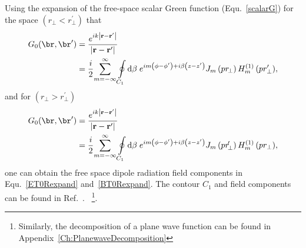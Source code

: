 \documentclass[]{report}
\begin{document}
Using the expansion of the free-space scalar Green function (Equ.~\eqref{scalarG}) for the space $ \left(r\!_\perp <r_\perp ^{\prime}\right) $ that 
\begin{align}
G_0(\br,\br') &={\frac{{e^{ik{\left| {{\rm {\bf r}}-{\rm {\bf {r}^{\prime }}}}\right| }}}}{{{%
\left| {{\rm {\bf r}}-{\rm {\bf {r}^{\prime }}}}\right| }}}}\nonumber\\
&={\frac{{i}}{{2}}%
}{\sum\limits_{m=-\infty }^{\infty } {{\oint\limits_{C_{1}}{\mathrm{d}\beta \;e^{im\left( {\phi -{\phi }%
^{\prime }}\right) +i\beta \left( {z-{z}^{\prime }}\right) }J_{m}\left( {pr\!_\perp
}\right) H_{m}^{\left( {1}\right) }\left( pr_\perp ^{\prime
}\right) }}}},
\end{align}
and for $ \left(r\!_\perp >r_\perp ^{\prime}\right) $
\begin{align}
G_0(\br,\br') &={\frac{{e^{ik{\left| {{\rm {\bf r}}-{\rm {\bf {r}^{\prime }}}}\right| }}}}{{{%
\left| {{\rm {\bf r}}-{\rm {\bf {r}^{\prime }}}}\right| }}}}\nonumber\\
&={\frac{{i}}{{2}}%
}{\sum\limits_{m=-\infty }^{\infty } {{\oint\limits_{C_{1}}{\mathrm{d}\beta \;e^{im\left( {\phi -{\phi }%
^{\prime }}\right) +i\beta \left( {z-{z}^{\prime }}\right) }J_{m}\left( {pr\!_\perp^{\prime} }\right) H_{m}^{\left( {1}\right) }\left( pr_\perp \right) }}}},
\end{align}
one can obtain the free space dipole radiation field components in Equ.~\eqref{ET0Rexpand} and~\eqref{BT0Rexpand}. The contour $ C_1 $ and field components can be found in Ref.~\cite{Klimov2004}. ~\footnote{Similarly, the decomposition of a plane wave function can be found in Appendix~\ref{Ch:PlanewaveDecomposition}}.
\end{document}
